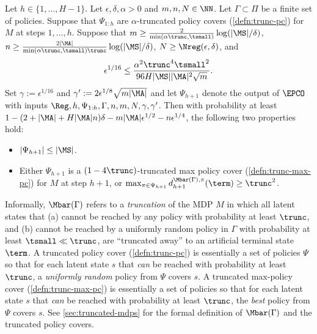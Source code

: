 \begin{theorem}\label{thm:extend-pc-trunc-online}
Let $h \in \{1,\dots,H-1\}$. Let $\epsilon,\delta,\alpha > 0$ and $m,n,N \in \NN$. Let $\Gamma \subset \Pi$ be a finite set of policies. Suppose that $\Psi_{1:h}$ are $\alpha$-truncated policy covers (\cref{defn:trunc-pc}) for $M$ at steps $1,\dots,h$. Suppose that $m \geq \frac{2}{\min(\alpha\trunc,\tsmall)}\log(|\MS|/\delta)$, $n \geq \frac{2|\MA|}{\min(\alpha\trunc,\tsmall)\trunc} \log(|\MS|/\delta)$, $N \geq \Nreg(\epsilon,\delta)$, and 
\begin{equation} \epsilon^{1/16} \leq \frac{\alpha^2\trunc^4\tsmall^2}{96H|\MS||\MA|^2\sqrt{m}}.\label{eq:param-assm-online}
\end{equation}
Set $\gamma := \epsilon^{1/16}$ and $\gamma' := 2\epsilon^{1/8}\sqrt{m|\MA|}$ and let $\Psi_{h+1}$ denote the output of $\EPCO$ with inputs $\Reg,h,\Psi_{1:h},\Gamma,n,m,N,\gamma,\gamma'$. Then with probability at least $1 - (2+|\MA|+H|\MA|n)\delta - m|\MA|\epsilon^{1/2} - n\epsilon^{1/4}$, the following two properties hold:
\begin{itemize}
\item $|\Psi_{h+1}| \leq |\MS|$.
\item Either $\Psi_{h+1}$ is a $(1-4\trunc)$-truncated max policy cover (\cref{defn:trunc-max-pc}) for $M$ at step $h+1$, or $\max_{\pi\in\Psi_{h+1}} d^{\Mbar(\Gamma),\pi}_{h+1}(\term) \geq \trunc^2$.
\end{itemize}
\end{theorem}

Informally, $\Mbar(\Gamma)$ refers to a \emph{truncation} of the MDP $M$ in which all latent states that (a) cannot be reached by any policy with probability at least $\trunc$, and (b) cannot be reached by a uniformly random policy in $\Gamma$ with probability at least $\tsmall \ll \trunc$, are ``truncated away'' to an artificial terminal state $\term$. A truncated policy cover (\cref{defn:trunc-pc}) is essentially a set of policies $\Psi$ so that for each latent state $s$ that \emph{can} be reached with probability at least $\trunc$, a \emph{uniformly random} policy from $\Psi$ covers $s$. A truncated max-policy cover (\cref{defn:trunc-max-pc}) is essentially a set of policies so that for each latent state $s$ that \emph{can} be reached with probability at least $\trunc$, the \emph{best} policy from $\Psi$ covers $s$. See \cref{sec:truncated-mdps} for the formal definition of $\Mbar(\Gamma)$ and the truncated policy covers.

